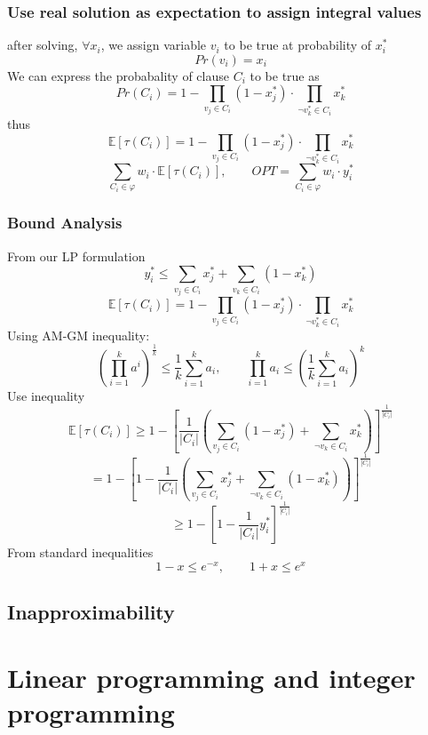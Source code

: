 \documentclass[10pt]{article}
\theoremstyle{definition}
\begin{document}
\subsubsection*{Use real solution as expectation to assign integral values}
after solving, $\forall x_i$, we assign variable $v_i$ to be true at probability of $x_i^*$
\[Pr(v_i) = x_i\]
We can express the probabality of clause $C_i$ to be true as 
\[Pr(C_i) = 1 - \prod_{v_j \in C_i} (1 - x_j^*) \cdot \prod_{\neg v_k^* \in C_i} x_k^*\]
thus 
\[\mathbb{E}[\tau(C_i)] = 1 - \prod_{v_j \in C_i} (1 - x_j^*) \cdot \prod_{\neg v_k^* \in C_i} x^*_k\]
\[\sum_{C_i \in \varphi} w_i \cdot \mathbb{E}[\tau(C_i)], \quad\quad OPT = \sum_{C_i \in \varphi} w_i \cdot y_i^*\]
\subsubsection*{Bound Analysis}
From our LP formulation 
\[y_i^* \leq \sum_{v_j \in C_i} x_j^* + \sum_{v_k \in C_i} (1 - x_k^*)\]
\[\mathbb{E}[\tau(C_i)] = 1 - \prod_{v_j \in C_i} (1 - x_j^*) \cdot \prod_{\neg v_k^* \in C_i} x^*_k\]
Using AM-GM inequality: 
\[(\prod_{i=1}^k a^i)^{\frac{1}{k}} \leq \frac{1}{k} \sum_{i=1}^{k}a_i, \quad\quad \prod_{i=1}^{k} a_i \leq (\frac{1}{k} \sum_{i=1}^k a_i)^k\]
Use inequality
\[\mathbb{E}[\tau(C_i)] \geq 1 - \left[ \frac{1}{|C_i|} \left(\sum_{v_j \in C_i} (1 - x_j^*) + \sum_{\neg v_k \in C_i} x_k^* \right)\right]^{\frac{1}{|C_i|}}\]
\[= 1 - \left[ 1 - \frac{1}{|C_i|} \left( \sum_{v_j \in C_i} x_j^* + \sum_{\neg v_k \in C_i} (1 - x_k^*) \right)\right]^{\frac{1}{|C_i|}}\]
\[\geq 1 - \left[ 1 - \frac{1}{|C_i|} y^*_i\right]^{\frac{1}{|C_i|}}\]
From standard inequalities 
\[1 - x \leq e^{-x}, \quad\quad 1 + x \leq e^x\]
\subsection{Inapproximability}









\section{Linear programming and integer programming}
\end{document}
